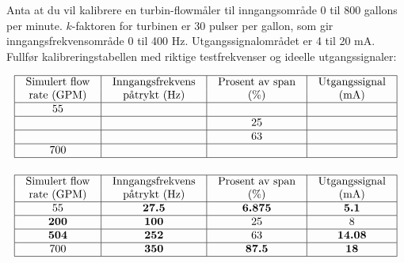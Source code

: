 

Anta at du vil kalibrere en turbin-flowmåler til inngangsområde 0 til 800 gallons per minute. $k$-faktoren for turbinen er 30 pulser per gallon, som gir inngangsfrekvensområde 0 til 400 Hz. Utgangssignalområdet er 4 til 20 mA. Fullfør kalibreringstabellen med riktige testfrekvenser og ideelle utgangssignaler:


$$\vbox{\offinterlineskip
\halign{\strut
\vrule \quad\hfil # \ \hfil &
\vrule \quad\hfil # \ \hfil &
\vrule \quad\hfil # \ \hfil &
\vrule \quad\hfil # \ \hfil \vrule \cr
\noalign{\hrule}
%
Simulert flow & Inngangsfrekvens & Prosent av span & Utgangssignal \cr
%
rate (GPM) & påtrykt (Hz) & (\%) & (mA) \cr
%
\noalign{\hrule}
%
55 &  &  &  \cr
%
\noalign{\hrule}
%
 &  & 25 &  \cr
%
\noalign{\hrule}
%
 &  & 63 &  \cr
%
\noalign{\hrule}
%
700 &  &  &  \cr
%
\noalign{\hrule}
} %
}$$ %








$$\vbox{\offinterlineskip
\halign{\strut
\vrule \quad\hfil # \ \hfil &
\vrule \quad\hfil # \ \hfil &
\vrule \quad\hfil # \ \hfil &
\vrule \quad\hfil # \ \hfil \vrule \cr
\noalign{\hrule}
%
Simulert flow & Inngangsfrekvens & Prosent av span & Utgangssignal \cr
%
rate (GPM) & påtrykt (Hz) & (\%) & (mA) \cr
%
\noalign{\hrule}
%
55 & {\bf 27.5} & {\bf 6.875} & {\bf 5.1} \cr
%
\noalign{\hrule}
%
{\bf 200} & {\bf 100} & 25 & 8 \cr
%
\noalign{\hrule}
%
{\bf 504} & {\bf 252} & 63 & {\bf 14.08} \cr
%
\noalign{\hrule}
%
700 & {\bf 350} & {\bf 87.5} & {\bf 18} \cr
%
\noalign{\hrule}
} %
}$$ %







